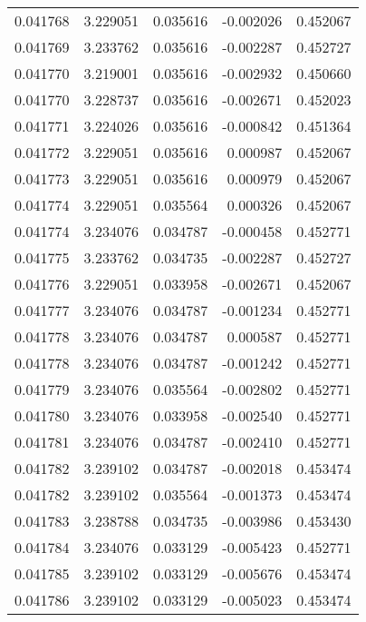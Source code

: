 \begin{tabular}{lrrrr}
0.041768    &  3.229051 &  0.035616 & -0.002026 &             0.452067 \\
0.041769    &  3.233762 &  0.035616 & -0.002287 &             0.452727 \\
0.041770    &  3.219001 &  0.035616 & -0.002932 &             0.450660 \\
0.041770    &  3.228737 &  0.035616 & -0.002671 &             0.452023 \\
0.041771    &  3.224026 &  0.035616 & -0.000842 &             0.451364 \\
0.041772    &  3.229051 &  0.035616 &  0.000987 &             0.452067 \\
0.041773    &  3.229051 &  0.035616 &  0.000979 &             0.452067 \\
0.041774    &  3.229051 &  0.035564 &  0.000326 &             0.452067 \\
0.041774    &  3.234076 &  0.034787 & -0.000458 &             0.452771 \\
0.041775    &  3.233762 &  0.034735 & -0.002287 &             0.452727 \\
0.041776    &  3.229051 &  0.033958 & -0.002671 &             0.452067 \\
0.041777    &  3.234076 &  0.034787 & -0.001234 &             0.452771 \\
0.041778    &  3.234076 &  0.034787 &  0.000587 &             0.452771 \\
0.041778    &  3.234076 &  0.034787 & -0.001242 &             0.452771 \\
0.041779    &  3.234076 &  0.035564 & -0.002802 &             0.452771 \\
0.041780    &  3.234076 &  0.033958 & -0.002540 &             0.452771 \\
0.041781    &  3.234076 &  0.034787 & -0.002410 &             0.452771 \\
0.041782    &  3.239102 &  0.034787 & -0.002018 &             0.453474 \\
0.041782    &  3.239102 &  0.035564 & -0.001373 &             0.453474 \\
0.041783    &  3.238788 &  0.034735 & -0.003986 &             0.453430 \\
0.041784    &  3.234076 &  0.033129 & -0.005423 &             0.452771 \\
0.041785    &  3.239102 &  0.033129 & -0.005676 &             0.453474 \\
0.041786    &  3.239102 &  0.033129 & -0.005023 &             0.453474 \\

\end{tabular}
